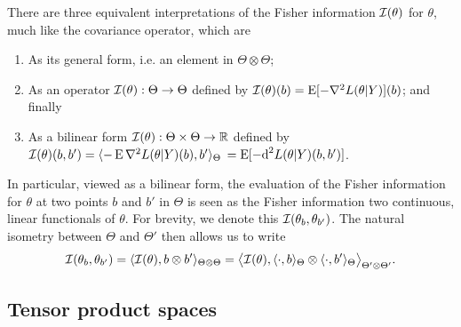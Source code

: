 There are three equivalent interpretations of the Fisher information ${\mathcal I}(\theta)$ for $\theta$, much like the covariance operator, which are 
\begin{enumerate}
  \item As its general form, i.e. an element in $\Theta\otimes\Theta$;
  \item As an operator ${\mathcal I}(\theta):\Theta\to\Theta$ defined by ${\mathcal I}(\theta)(b) = \operatorname{E}[- \nabla^2 L(\theta|Y)](b)$; and finally
  \item As a bilinear form ${\mathcal I}(\theta):\Theta\times\Theta\to\mathbb{R}$ defined by ${\mathcal I}(\theta)(b,b') = \langle-\operatorname{E} \nabla^2 L(\theta|Y)(b), b'\rangle_\Theta$ $= \operatorname{E} [-\text{d}^2 L(\theta|Y)(b,b') ]$.
\end{enumerate}
In particular, viewed as a bilinear form, the evaluation of the Fisher information for $\theta$ at two points $b$ and $b'$ in $\Theta$ is seen as the Fisher information 
two continuous, linear functionals of $\theta$.
For brevity, we denote this ${\mathcal I}(\theta_b,\theta_{b'})$.
The natural isometry between $\Theta$ and $\Theta'$ then allows us to write 
\begin{align}\label{eq:fisher-linear-functional}
  {\mathcal I}(\theta_b,\theta_{b'}) = \langle{\mathcal I}(\theta), b \otimes b'\rangle_{\Theta\otimes\Theta} = \big\langle{\mathcal I}(\theta), \langle\cdot,b\rangle_\Theta \otimes \langle\cdot,b'\rangle_\Theta \big\rangle_{\Theta'\otimes\Theta'}.
\end{align}




\subsection{Tensor product spaces}

